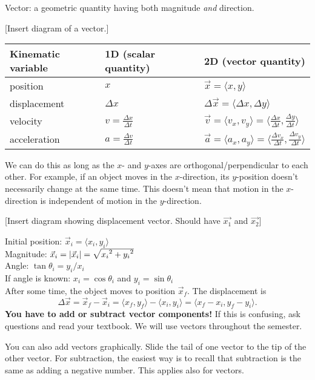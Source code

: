 Vector: a geometric quantity having both magnitude \textit{and} direction.

[Insert diagram of a vector.]

\clearpage
\begin{table}[h]
\begin{tabular}{lll}
\textbf{Kinematic variable} & \textbf{1D (scalar quantity)} & \textbf{2D (vector quantity)}\\
\hline
position & $x$ & $\vec{x}=\langle{x,y}\rangle$\\
displacement & $\Delta{x}$ & $\Delta\vec{x}=\langle{\Delta{x},\Delta{y}}\rangle$\\
velocity & $v=\frac{\Delta{x}}{\Delta{t}}$ & $\vec{v}=\langle{v_x,v_y}\rangle=\langle{\frac{\Delta{x}}{\Delta{t}},\frac{\Delta{y}}{\Delta{t}}}\rangle$\\
acceleration & $a=\frac{\Delta{v}}{\Delta{t}}$ & $\vec{a}=\langle{a_x,a_y}\rangle=\langle{\frac{\Delta{v_x}}{\Delta{t}},\frac{\Delta{v_y}}{\Delta{t}}}\rangle$\\
\hline
\end{tabular}
\end{table}

We can do this as long as the $x$- and $y$-axes are orthogonal/perpendicular to each other. For example, if an object moves in the $x$-direction, its $y$-position doesn't necessarily change at the same time. This doesn't mean that motion in the $x$-direction is independent of motion in the $y$-direction. 

[Insert diagram showing displacement vector. Should have $\vec{x_1}$ and $\vec{x_2}$]
\vspace{6cm}


Initial position: $\vec{x}_i=\langle{x_i,y_i}\rangle$\\
Magnitude: $\vec{x}_i=|\vec{x}_i|=\sqrt{x_i\displaystyle^2+y_i\displaystyle^2}$\\
Angle: $\tan\theta_i=y_i/x_i$\\
If angle is known: $x_i=\cos\theta_i$ and $y_i=\sin\theta_i$\\

After some time, the object moves to position $\vec{x}_f$. The displacement is $$\Delta\vec{x}=\vec{x}_f-\vec{x}_i=\langle{x_f,y_f}\rangle-\langle{x_i,y_i}\rangle=\langle{x_f-x_i,y_f-y_i}\rangle.$$ 
\textbf{You have to add or subtract vector components!} If this is confusing, ask questions and read your textbook. We will use vectors throughout the semester.

You can also add vectors graphically. Slide the tail of one vector to the tip of the other vector. For subtraction, the easiest way is to recall that subtraction is the same as adding a negative number. This applies also for vectors.

